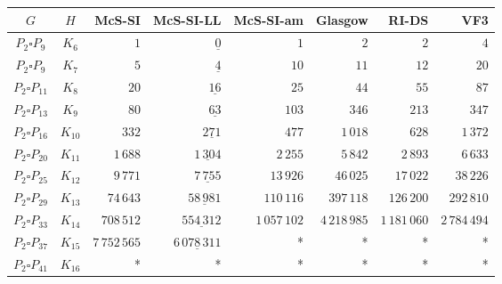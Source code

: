
\begin{tabular}{ccrrrrrr}
    \toprule
    {$G$} & {$H$} & {McS-SI} & {McS-SI-LL} & {McS-SI-am} & Glasgow & RI-DS & VF3\\ 
    \midrule

$P_2\square P_{9}$ & $K_{6}$ & $1$ & $\underline{0}$ & $1$ & $2$ & $2$ & $4$\\
$P_2\square P_{9}$ & $K_{7}$ & $5$ & $\underline{4}$ & $10$ & $11$ & $12$ & $20$\\
$P_2\square P_{11}$ & $K_{8}$ & $20$ & $\underline{16}$ & $25$ & $44$ & $55$ & $87$\\
$P_2\square P_{13}$ & $K_{9}$ & $80$ & $\underline{63}$ & $103$ & $346$ & $213$ & $347$\\
$P_2\square P_{16}$ & $K_{10}$ & $332$ & $\underline{271}$ & $477$ & $1\,018$ & $628$ & $1\,372$\\
$P_2\square P_{20}$ & $K_{11}$ & $1\,688$ & $\underline{1\,304}$ & $2\,255$ & $5\,842$ & $2\,893$ & $6\,633$\\
$P_2\square P_{25}$ & $K_{12}$ & $9\,771$ & $\underline{7\,755}$ & $13\,926$ & $46\,025$ & $17\,022$ & $38\,226$\\
$P_2\square P_{29}$ & $K_{13}$ & $74\,643$ & $\underline{58\,981}$ & $110\,116$ & $397\,118$ & $126\,200$ & $292\,810$\\
$P_2\square P_{33}$ & $K_{14}$ & $708\,512$ & $\underline{554\,312}$ & $1\,057\,102$ & $4\,218\,985$ & $1\,181\,060$ & $2\,784\,494$\\
$P_2\square P_{37}$ & $K_{15}$ & $7\,752\,565$ & $\underline{6\,078\,311}$ & * & * & * & *\\
$P_2\square P_{41}$ & $K_{16}$ & * & * & * & * & * & *\\

    \bottomrule
\end{tabular}

